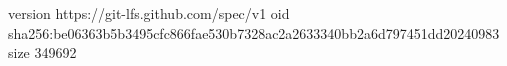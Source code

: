 version https://git-lfs.github.com/spec/v1
oid sha256:be06363b5b3495cfc866fae530b7328ac2a2633340bb2a6d797451dd20240983
size 349692
